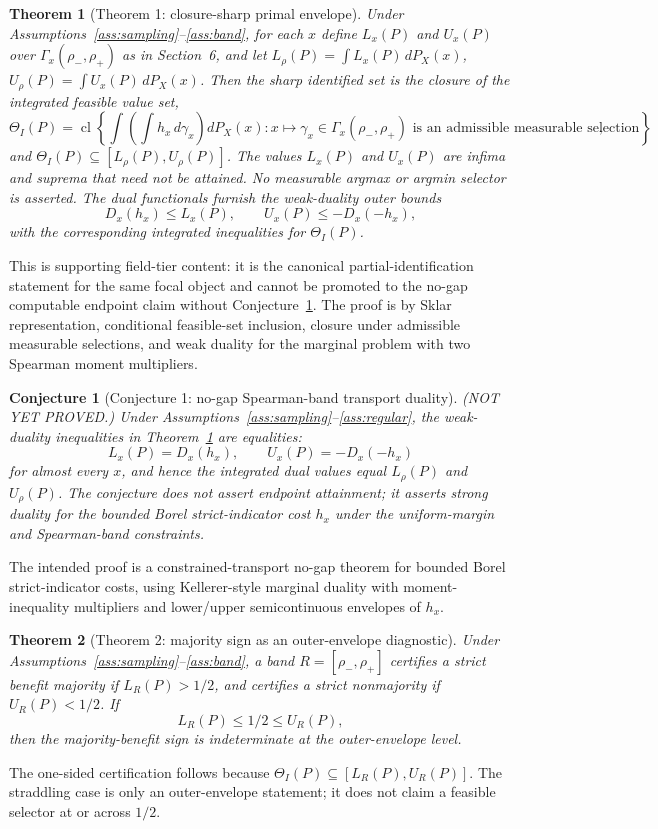 \documentclass[11pt]{article}
\theoremstyle{definition}
\theoremstyle{plain}
\newtheorem{theorem}{Theorem}
\newtheorem{conjecture}{Conjecture}
\theoremstyle{remark}
\begin{document}
\begin{theorem}[Theorem 1: closure-sharp primal envelope]\label{thm:k-sharp-dual-confirmed}
Under Assumptions~\ref{ass:sampling}--\ref{ass:band}, for each \(x\) define \(L_x(P)\) and \(U_x(P)\) over \(\Gamma_x(\rho_-,\rho_+)\) as in Section~6, and let \(L_\rho(P)=\int L_x(P)\,dP_X(x)\), \(U_\rho(P)=\int U_x(P)\,dP_X(x)\).  Then the sharp identified set is the closure of the integrated feasible value set,
\[
\Theta_I(P)=\operatorname{cl}\left\{\int\left(\int h_x\,d\gamma_x\right)dP_X(x):
x\mapsto\gamma_x\in\Gamma_x(\rho_-,\rho_+)\text{ is an admissible measurable selection}\right\},
\]
and \(\Theta_I(P)\subseteq[L_\rho(P),U_\rho(P)]\).  The values \(L_x(P)\) and \(U_x(P)\) are infima and suprema that need not be attained.  No measurable argmax or argmin selector is asserted.  The dual functionals furnish the weak-duality outer bounds
\[
D_x(h_x)\le L_x(P),\qquad U_x(P)\le -D_x(-h_x),
\]
with the corresponding integrated inequalities for \(\Theta_I(P)\).
\end{theorem}
This is supporting field-tier content: it is the canonical partial-identification statement for the same focal object and cannot be promoted to the no-gap computable endpoint claim without Conjecture~\ref{conj:sharp-dual}.  The proof is by Sklar representation, conditional feasible-set inclusion, closure under admissible measurable selections, and weak duality for the marginal problem with two Spearman moment multipliers.

\begin{conjecture}[Conjecture 1: no-gap Spearman-band transport duality]\label{conj:sharp-dual}
(NOT YET PROVED.)  Under Assumptions~\ref{ass:sampling}--\ref{ass:regular}, the weak-duality inequalities in Theorem~\ref{thm:k-sharp-dual-confirmed} are equalities:
\[
L_x(P)=D_x(h_x),\qquad U_x(P)=-D_x(-h_x)
\]
for almost every \(x\), and hence the integrated dual values equal \(L_\rho(P)\) and \(U_\rho(P)\).  The conjecture does not assert endpoint attainment; it asserts strong duality for the bounded Borel strict-indicator cost \(h_x\) under the uniform-margin and Spearman-band constraints.
\end{conjecture}
The intended proof is a constrained-transport no-gap theorem for bounded Borel strict-indicator costs, using Kellerer-style marginal duality with moment-inequality multipliers and lower/upper semicontinuous envelopes of \(h_x\).

\begin{theorem}[Theorem 2: majority sign as an outer-envelope diagnostic]\label{thm:critical-set}
Under Assumptions~\ref{ass:sampling}--\ref{ass:band}, a band \(R=[\rho_-,\rho_+]\) certifies a strict benefit majority if \(L_R(P)>1/2\), and certifies a strict nonmajority if \(U_R(P)<1/2\).  If
\[
L_R(P)\le 1/2\le U_R(P),
\]
then the majority-benefit sign is indeterminate at the outer-envelope level.
\end{theorem}
The one-sided certification follows because \(\Theta_I(P)\subseteq[L_R(P),U_R(P)]\).  The straddling case is only an outer-envelope statement; it does not claim a feasible selector at or across \(1/2\).
\end{document}
